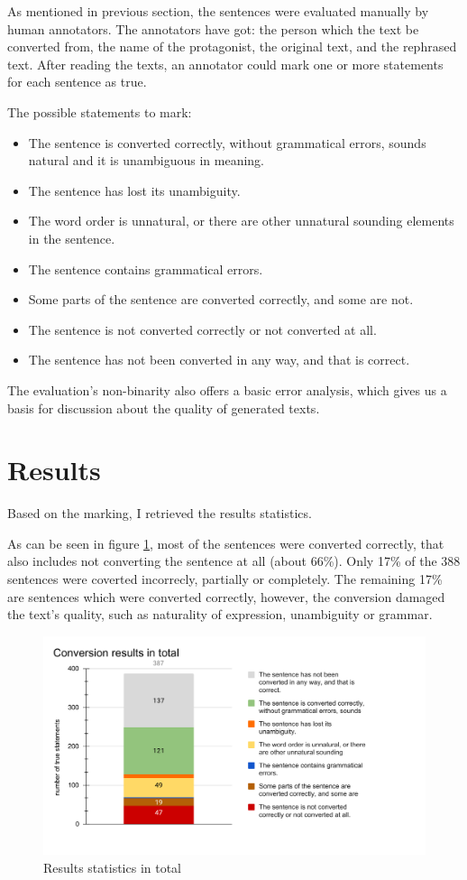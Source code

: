 As mentioned in previous section, the sentences were evaluated manually by human annotators. The annotators have got: the person which the text be converted from, the name of the protagonist, the original text, and the rephrased text. After reading the texts, an annotator could mark one or more statements for each sentence as true.

The possible statements to mark:

\begin{itemize}
	\item The sentence is converted correctly, without grammatical errors, sounds natural and it is unambiguous in meaning.
	\item The sentence has lost its unambiguity.
	\item The word order is unnatural, or there are other unnatural sounding elements in the sentence.
	\item The sentence contains grammatical errors.
	\item Some parts of the sentence are converted correctly, and some are not.
	\item The sentence is not converted correctly or not converted at all.
	\item The sentence has not been converted in any way, and that is correct.
\end{itemize}

The evaluation's non-binarity also offers a basic error analysis, which gives us a basis for discussion about the quality of generated texts.

\section{Results}

Based on the marking, I retrieved the results statistics.

As can be seen in figure \ref{fig:eval-total}, most of the sentences were converted correctly, that also includes not converting the sentence at all (about 66\%). Only 17\% of the 388 sentences were coverted incorrecly, partially or completely. The remaining 17\% are sentences which were converted correctly, however, the conversion damaged the text's quality, such as naturality of expression, unambiguity or grammar.

\begin{figure}[!ht]
\includegraphics[width=\textwidth]{data/Eval-Total.pdf}
\caption{Results statistics in total}
\label{fig:eval-total}
\end{figure}

